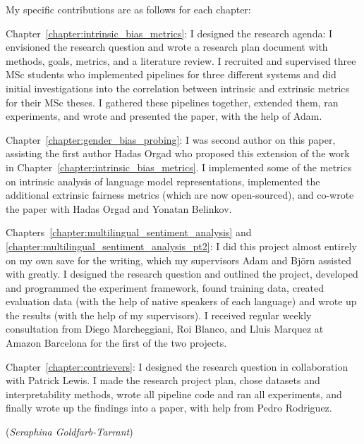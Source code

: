 \documentclass[phd,ilcc,oneside,leftchapter,parskip]{infthesis}
\begin{document}
\begin{preliminary}
\begin{declaration}
   My specific contributions are as follows for each chapter:
   
   Chapter~\ref{chapter:intrinsic_bias_metrics}: I designed the research agenda: I envisioned the research question and wrote a research plan document with methods, goals, metrics, and a literature review. I recruited and supervised three MSc students who implemented pipelines for three different systems and did initial investigations into the correlation between intrinsic and extrinsic metrics for their MSc theses. I gathered these pipelines together, extended them, ran experiments, and wrote and presented the paper, with the help of Adam. 

   Chapter~\ref{chapter:gender_bias_probing}: I was second author on this paper, assisting the first author Hadas Orgad who proposed this extension of the work in Chapter~\ref{chapter:intrinsic_bias_metrics}. I implemented some of the metrics on intrinsic analysis of language model representations, implemented the additional extrinsic fairness metrics (which are now open-sourced), and co-wrote the paper with Hadas Orgad and Yonatan Belinkov.

   Chapters~\ref{chapter:multilingual_sentiment_analysis} and \ref{chapter:multilingual_sentiment_analysis_pt2}: I did this project almost entirely on my own save for the writing, which my supervisors Adam and Björn assisted with greatly. I designed the research question and outlined the project, developed and programmed the experiment framework, found training data, created evaluation data (with the help of native speakers of each language) and wrote up the results (with the help of my supervisors). I received regular weekly consultation from Diego Marcheggiani, Roi Blanco, and Lluis Marquez at Amazon Barcelona for the first of the two projects.

   Chapter~\ref{chapter:contrievers}: I designed the research question in collaboration with Patrick Lewis. I made the research project plan, chose datasets and interpretability methods, wrote all pipeline code and ran all experiments, and finally wrote up the findings into a paper, with help from Pedro Rodriguez.

   \par
   \vspace{1in}\raggedleft({\em Seraphina Goldfarb-Tarrant})
   \end{declaration}


\tableofcontents


\end{preliminary}
\end{document}
